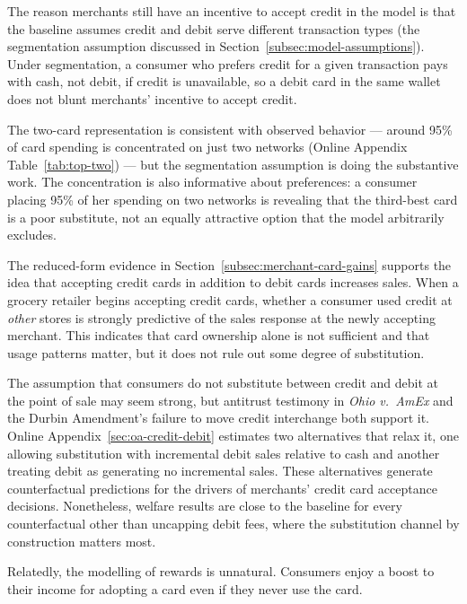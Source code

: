\documentclass[main.tex]{subfiles}
\begin{document}
\begin{refsection}
The reason merchants still have an incentive to accept credit in the model is that the baseline assumes credit and debit serve different transaction types (the segmentation assumption discussed in Section~\ref{subsec:model-assumptions}).
Under segmentation, a consumer who prefers credit for a given transaction pays with cash, not debit, if credit is unavailable, so a debit card in the same wallet does not blunt merchants' incentive to accept credit.

The two-card representation is consistent with observed behavior --- around 95\% of card spending is concentrated on just two networks (Online Appendix Table~\ref{tab:top-two}) --- but the segmentation assumption is doing the substantive work.
The concentration is also informative about preferences: a consumer placing 95\% of her spending on two networks is revealing that the third-best card is a poor substitute, not an equally attractive option that the model arbitrarily excludes.

The reduced-form evidence in Section~\ref{subsec:merchant-card-gains} supports the idea that accepting credit cards in addition to debit cards increases sales.
When a grocery retailer begins accepting credit cards, whether a consumer used credit at \emph{other} stores is strongly predictive of the sales response at the newly accepting merchant.
This indicates that card ownership alone is not sufficient and that usage patterns matter, but it does not rule out some degree of substitution.

The assumption that consumers do not substitute between credit and debit at the point of sale may seem strong, but antitrust testimony in \emph{Ohio v.\ AmEx} and the Durbin Amendment's failure to move credit interchange both support it.
Online Appendix~\ref{sec:oa-credit-debit} estimates two alternatives that relax it, one allowing substitution with incremental debit sales relative to cash and another treating debit as generating no incremental sales.
These alternatives generate counterfactual predictions for the drivers of merchants' credit card acceptance decisions.
Nonetheless, welfare results are close to the baseline for every counterfactual other than uncapping debit fees, where the substitution channel by construction matters most.

\begin{refcommentnoclear}
Relatedly, the modelling of rewards is unnatural. Consumers enjoy a boost to their income for adopting a card even if they never use the card.


\end{refcommentnoclear}
\end{refsection}
\end{document}
